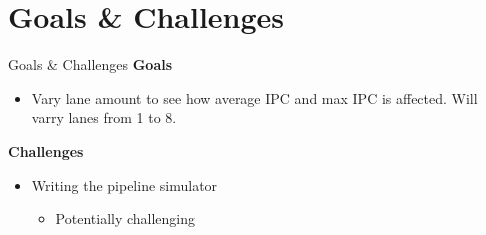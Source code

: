\documentclass{beamer}
\begin{document}
\section{Goals \& Challenges}
\begin{frame}{Goals \& Challenges}
    \textbf{Goals}
    \begin{itemize}
        \item Vary lane amount to see how average IPC and max IPC is affected. Will varry lanes from 
            1 to 8.
    \end{itemize}
    \textbf{Challenges}
    \begin{itemize}
        \item Writing the pipeline simulator
            \begin{itemize}
                \item Potentially challenging
            \end{itemize}
    \end{itemize}
\end{frame}

\end{document}

